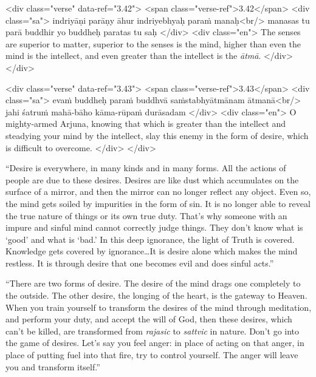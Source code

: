 \begin{html}
<div class="verse" data-ref="3.42">
  <span class="verse-ref">3.42</span>
  <div class="sa">
    indriyāṇi parāṇy āhur indriyebhyaḥ paraṁ manaḥ<br/>
    manasas tu parā buddhir yo buddheḥ paratas tu saḥ
  </div>
  <div class="en">
    The senses are superior to matter, superior to the senses is the mind, higher than even the mind is the intellect, and even greater than the intellect is the \textit{ātmā}.
  </div>
</div>
\end{html}



\begin{html}
<div class="verse" data-ref="3.43">
  <span class="verse-ref">3.43</span>
  <div class="sa">
    evaṁ buddheḥ paraṁ buddhvā saṁstabhyātmānam ātmanā<br/>
    jahi śatruṁ mahā-bāho kāma-rūpaṁ durāsadam
  </div>
  <div class="en">
    O mighty-armed Arjuna, knowing that which is greater than the intellect and steadying your mind by the intellect, slay this enemy in the form of desire, which is difficult to overcome.
  </div>
</div>
\end{html}


\enquote{Desire is everywhere, in many kinds and in many forms. All the actions of people are due to these desires. Desires are like dust which accumulates on the surface of a mirror, and then the mirror can no longer reflect any object. Even so, the mind gets soiled by impurities in the form of sin. It is no longer able to reveal the true nature of things or its own true duty. That’s why someone with an impure and sinful mind cannot correctly judge things. They don’t know what is \enquote{good} and what is \enquote{bad.} In this deep ignorance, the light of Truth is covered. Knowledge gets covered by ignorance\ldots It is desire alone which makes the mind restless. It is through desire that one becomes evil and does sinful acts.}

\enquote{There are two forms of desire. The desire of the mind drags one completely to the outside. The other desire, the longing of the heart, is the gateway to Heaven. When you train yourself to transform the desires of the mind through meditation, and perform your duty, and accept the will of God, then these desires, which can’t be killed, are transformed from \textit{rajasic} to \textit{sattvic} in nature. Don’t go into the game of desires. Let’s say you feel anger: in place of acting on that anger, in place of putting fuel into that fire, try to control yourself. The anger will leave you and transform itself.}

